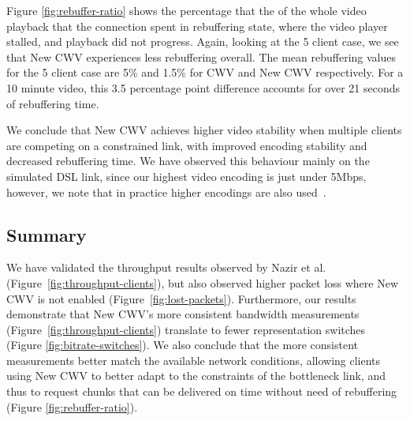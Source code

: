 \documentclass[10pt,sigconf,anonymous]{acmart}
\begin{document}
Figure \ref{fig:rebuffer-ratio} shows the percentage that the of the whole video playback that the connection spent in rebuffering state, where the video player stalled, and playback did not progress. Again, looking at the 5 client case, we see that New CWV experiences less rebuffering overall. The mean rebuffering values for the 5 client case are 5\% and 1.5\% for CWV and New CWV respectively. For a 10 minute video, this 3.5 percentage point difference accounts for over 21 seconds of rebuffering time.


We conclude that New CWV achieves higher video stability when multiple clients are competing on a constrained link, with improved encoding stability and decreased rebuffering time. We have observed this behaviour mainly on the simulated DSL link, since our highest video encoding is just under 5Mbps, however, we note that in practice higher encodings are also used~\cite{online-youtube-encodings}.

\subsection{Summary}
\label{sec:summary}

We have validated the throughput results observed by Nazir et al.~\cite{Nazir-2014-performance-evaluation-congestion-window-validation-dash-newcwv} (Figure~\ref{fig:throughput-clients}), but also observed higher packet loss where New CWV is not enabled (Figure~\ref{fig:lost-packets}). Furthermore, our results demonstrate that New CWV's more consistent bandwidth measurements (Figure~\ref{fig:throughput-clients}) translate to fewer representation switches (Figure \ref{fig:bitrate-switches}). We also conclude that the more consistent measurements better match the available network conditions, allowing clients using New CWV to better adapt to the constraints of the bottleneck link, and thus to request chunks that can be delivered on time without need of rebuffering (Figure \ref{fig:rebuffer-ratio}).

\end{document}

